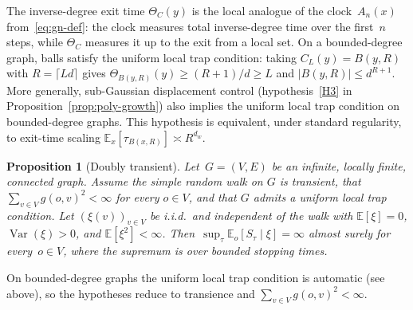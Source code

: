\documentclass[11pt]{amsart}
\theoremstyle{plain}
\newtheorem{proposition}[theorem]{Proposition}
\theoremstyle{definition}
\newcommand{\E}{\mathbb{E}}
\DeclareMathOperator{\var}{Var}
\begin{document}
	The inverse-degree exit time $\Theta_C(y)$ is the local analogue of the clock~$A_n(x)$ from~\eqref{eq:gn-def}: the clock measures total inverse-degree time over the first~$n$ steps, while $\Theta_C$ measures it up to the exit from a local set. On a bounded-degree graph, balls satisfy the uniform local trap condition: taking $C_L(y)=B(y,R)$ with $R=\lceil Ld\rceil$ gives $\Theta_{B(y,R)}(y)\geq(R+1)/d\geq L$ and $|B(y,R)|\leq d^{R+1}$. More generally, sub-Gaussian displacement control (hypothesis~\ref{H3} in Proposition~\ref{prop:poly-growth}) also implies the uniform local trap condition on bounded-degree graphs. This hypothesis is equivalent, under standard regularity, to exit-time scaling $\E_x[\tau_{B(x,R)}]\asymp R^{d_w}$.
	
	\begin{proposition}[Doubly transient]\label{prop:doubly-transient-really-general}
		Let~$G = (V,E)$ be an infinite, locally finite, connected graph. Assume the simple random walk on $G$ is transient, that $\sum_{v\in V}g(o,v)^2<\infty$ for every $o\in V$,
		and that $G$ admits a uniform local trap condition.
		Let $(\xi(v))_{v\in V}$ be i.i.d.\ and independent of the walk with $\E[\xi]=0$, $\var(\xi)>0$, and $\E[\xi^2]<\infty$. Then~$\sup_{\tau}\E_o[S_\tau\mid\xi]=\infty$ almost surely for every~$o\in V$, where the supremum is over bounded stopping times.
	\end{proposition}
	
	On bounded-degree graphs the uniform local trap condition is automatic (see above), so the hypotheses reduce to transience and $\sum_{v\in V} g(o,v)^2<\infty$.
	
\end{document}
